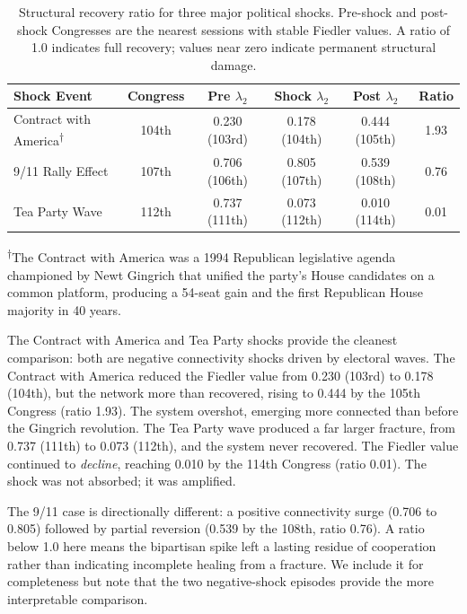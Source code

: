 \documentclass[12pt, a4paper]{article}
\begin{document}
\begin{table}[H]
\centering
\caption{Structural recovery ratio for three major political shocks. Pre-shock and post-shock Congresses are the nearest sessions with stable Fiedler values. A ratio of 1.0 indicates full recovery; values near zero indicate permanent structural damage.}
\label{tab:resilience}
\begin{tabular}{lccccc}
\toprule
Shock Event & Congress & Pre $\lambda_2$ & Shock $\lambda_2$ & Post $\lambda_2$ & Ratio \\
\midrule
Contract with America\textsuperscript{$\dagger$} & 104th & 0.230 (103rd) & 0.178 (104th) & 0.444 (105th) & 1.93 \\
9/11 Rally Effect & 107th & 0.706 (106th) & 0.805 (107th) & 0.539 (108th) & 0.76 \\
Tea Party Wave & 112th & 0.737 (111th) & 0.073 (112th) & 0.010 (114th) & 0.01 \\
\bottomrule
\end{tabular}
\vspace{2pt}

{\footnotesize \textsuperscript{$\dagger$}The Contract with America was a 1994 Republican legislative agenda championed by Newt Gingrich that unified the party's House candidates on a common platform, producing a 54-seat gain and the first Republican House majority in 40 years.}
\end{table}

The Contract with America and Tea Party shocks provide the cleanest comparison: both are negative connectivity shocks driven by electoral waves. The Contract with America reduced the Fiedler value from 0.230 (103rd) to 0.178 (104th), but the network more than recovered, rising to 0.444 by the 105th Congress (ratio 1.93). The system overshot, emerging more connected than before the Gingrich revolution. The Tea Party wave produced a far larger fracture, from 0.737 (111th) to 0.073 (112th), and the system never recovered. The Fiedler value continued to \textit{decline}, reaching 0.010 by the 114th Congress (ratio 0.01). The shock was not absorbed; it was amplified.

The 9/11 case is directionally different: a positive connectivity surge (0.706 to 0.805) followed by partial reversion (0.539 by the 108th, ratio 0.76). A ratio below 1.0 here means the bipartisan spike left a lasting residue of cooperation rather than indicating incomplete healing from a fracture. We include it for completeness but note that the two negative-shock episodes provide the more interpretable comparison.
\end{document}
